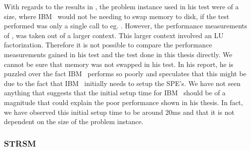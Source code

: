 With regards to the results in \cite{scipy}, the problem instance used
in his test were of a size, where IBM \BLAS\ would not be needing to
swap memory to disk, if the test performed was only a single call to
eg. . However, the performance measurements
of , was taken out of a larger context. This larger
context involved an LU factorization. Therefore it is not possible to
compare the performance measurements gained in his 
test and the  test done in this thesis directly. We
cannot be sure that memory was not swapped in his test. In his
report, he is puzzled over the fact IBM \BLAS\ performs so poorly and
speculates that this might be due to the fact that IBM \BLAS\
initially needs to setup the SPE's. We have not seen anything that
suggests that the initial setup time for IBM \BLAS\ should be of a
magnitude that could explain the poor performance shown in his
thesis. In fact, we have observed this initial setup time to be
around 20ms and that it is not dependent on the size of the problem
instance.







\subsubsection{STRSM}

